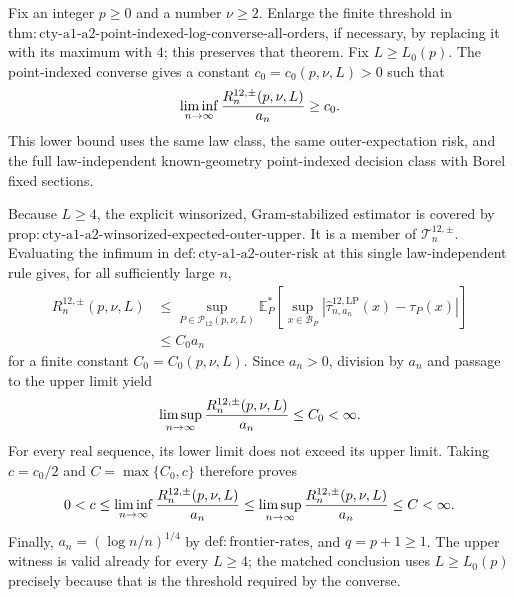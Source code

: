 Fix an integer \(p\geq0\) and a number \(\nu\geq2\).  Enlarge the finite threshold in \(\mathrm{thm:cty\text{-}a1\text{-}a2\text{-}point\text{-}indexed\text{-}log\text{-}converse\text{-}all\text{-}orders}\), if necessary, by replacing it with its maximum with \(4\); this preserves that theorem.  Fix \(L\geq L_0(p)\).  The point-indexed converse gives a constant \(c_0=c_0(p,\nu,L)>0\) such that
\[
 \liminf_{n\to\infty}{R_n^{12,\pm}(p,\nu,L)\over a_n}\geq c_0.
\]
This lower bound uses the same law class, the same outer-expectation risk, and the full law-independent known-geometry point-indexed decision class with Borel fixed sections.

Because \(L\geq4\), the explicit winsorized, Gram-stabilized estimator is covered by \(\mathrm{prop:cty\text{-}a1\text{-}a2\text{-}winsorized\text{-}expected\text{-}outer\text{-}upper}\).  It is a member of \(\mathcal T_n^{12,\pm}\).  Evaluating the infimum in \(\mathrm{def:cty\text{-}a1\text{-}a2\text{-}outer\text{-}risk}\) at this single law-independent rule gives, for all sufficiently large \(n\),
\[
 \begin{split}
 R_n^{12,\pm}(p,\nu,L)
 &\leq \sup_{P\in\mathcal P_{12}(p,\nu,L)}
 \mathbb E_P^*\!\left[
 \sup_{x\in\mathcal B_P}
 |\widehat\tau^{12,\mathrm{LP}}_{n,a_n}(x)-\tau_P(x)|
 \right]\\
 &\leq C_0a_n
 \end{split}
\]
for a finite constant \(C_0=C_0(p,\nu,L)\).  Since \(a_n>0\), division by \(a_n\) and passage to the upper limit yield
\[
 \limsup_{n\to\infty}{R_n^{12,\pm}(p,\nu,L)\over a_n}\leq C_0<\infty.
\]
For every real sequence, its lower limit does not exceed its upper limit.  Taking \(c=c_0/2\) and \(C=\max\{C_0,c\}\) therefore proves
\[
 0<c\leq\liminf_{n\to\infty}{R_n^{12,\pm}(p,\nu,L)\over a_n}
 \leq\limsup_{n\to\infty}{R_n^{12,\pm}(p,\nu,L)\over a_n}
 \leq C<\infty.
\]
Finally, \(a_n=(\log n/n)^{1/4}\) by \(\mathrm{def:frontier\text{-}rates}\), and \(q=p+1\geq1\).  The upper witness is valid already for every \(L\geq4\); the matched conclusion uses \(L\geq L_0(p)\) precisely because that is the threshold required by the converse.